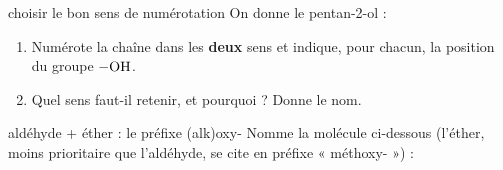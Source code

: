 \documentclass[11pt,a4paper]{article}
\begin{document}
\begin{exo}{choisir le bon sens de numérotation}
On donne le pentan-2-ol :
\begin{center}\end{center}
\begin{enumerate}[label=\textbf{\alph*)},leftmargin=2em,itemsep=1pt]
  \item Numérote la chaîne dans les \textbf{deux} sens et indique, pour chacun, la position du groupe $\ce{-OH}$.
  \item Quel sens faut-il retenir, et pourquoi ? Donne le nom.
\end{enumerate}
\end{exo}

\begin{exo}{aldéhyde + éther : le préfixe (alk)oxy-}
Nomme la molécule ci-dessous (l'éther, moins prioritaire que l'aldéhyde, se cite en préfixe « méthoxy- ») :
\begin{center}\end{center}
\end{exo}
\end{document}
